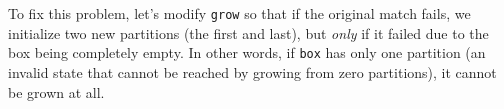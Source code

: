 To fix this problem, let's modify \texttt{grow} so that if the original match fails, we initialize two new partitions (the first and last), but \emph{only} if
it failed due to the box being completely empty. In other words, if \texttt{box} has only one partition (an invalid state that cannot be reached by
growing from zero partitions), it cannot be grown at all.







